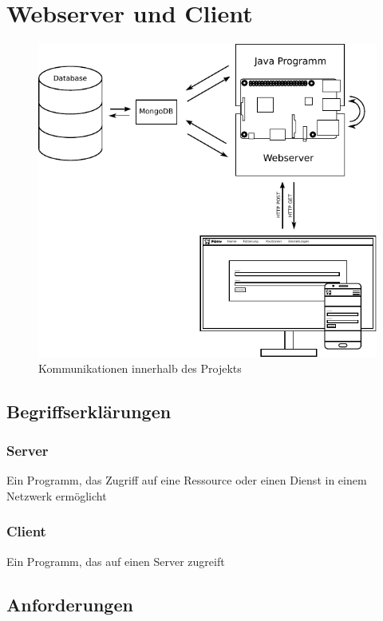 \chapter{Webserver und Client}

\begin{figure}[H]
	\includegraphics[width=1\textwidth]{Bilder/SVGS/Communication}
	\caption{Kommunikationen innerhalb des Projekts}
	\label{kommunikation}
\end{figure}

\section{Begriffserklärungen}
\label{sec:begriffserklaerung}

\subsection{Server}
\label{sec:begrr-server}
Ein Programm, das Zugriff auf eine Ressource oder einen Dienst in einem Netzwerk ermöglicht

\subsection{Client}
\label{sec:begrr-client}
Ein Programm, das auf einen Server zugreift

\section{Anforderungen}
\label{sec:anforderungen}

